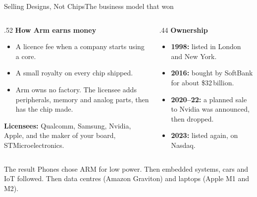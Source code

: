 \documentclass[9pt,aspectratio=169,xcolor=table]{beamer}
\begin{document}
{\beamerextras
\begin{frame}{Selling Designs, Not Chips}{The business model that won}
    \begin{columns}[T]
    \begin{column}{.52\textwidth}
        \textbf{How Arm earns money}
        {\small
        \begin{itemize}\itemsep2pt
            \item A \alert{licence fee} when a company starts using a core.
            \item A small \alert{royalty} on every chip shipped.
            \item Arm owns no factory. The licensee adds peripherals, memory and analog parts, then has the chip made.
        \end{itemize}}
        \vspace{2mm}
        {\small \textbf{Licensees:} Qualcomm, Samsung, Nvidia, Apple, and the maker of your board, \alert{STMicroelectronics}.}
    \end{column}
    \begin{column}{.44\textwidth}
        \textbf{Ownership}
        {\small
        \begin{itemize}\itemsep2pt
            \item \textbf{1998:} listed in London and New York.
            \item \textbf{2016:} bought by SoftBank for about \$32\,billion.
            \item \textbf{2020--22:} a planned sale to Nvidia was announced, then dropped.
            \item \textbf{2023:} listed again, on Nasdaq.
        \end{itemize}}
    \end{column}
    \end{columns}

    \vspace{3mm}
    \begin{block}{The result}
        {\small Phones chose ARM for low power. Then embedded systems, cars and IoT followed. Then data centres (Amazon Graviton) and laptops (Apple M1 and M2).}
    \end{block}
\end{frame}
}
\end{document}
